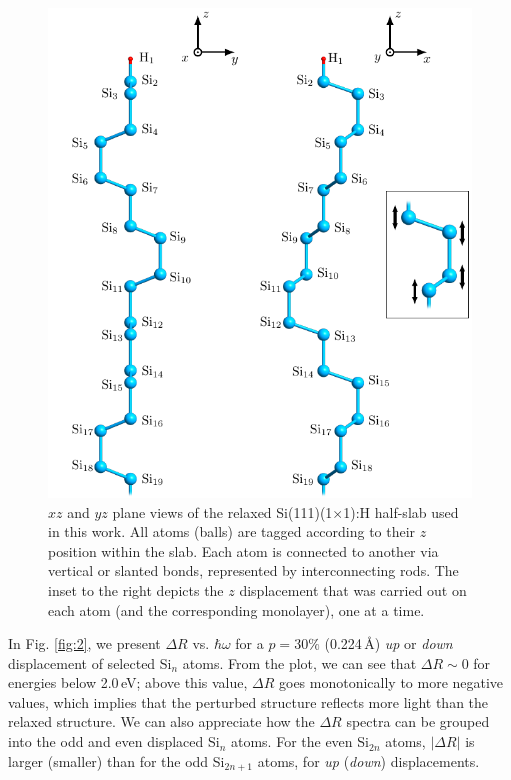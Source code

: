 \documentclass[pss]{wiley2sp} %
\begin{document}
\begin{figure}[t]%
\includegraphics[width=\linewidth]{fig01}
\caption{$xz$ and $yz$ plane views of the relaxed Si(111)(1$\times$1):H
half-slab used in this work. All atoms (balls) are tagged according to their $z$
position within the slab. Each atom is connected to another via vertical or
slanted bonds, represented by interconnecting rods. The inset to the right
depicts the $z$ displacement that was carried out on {\color{red}each atom (and the corresponding monolayer)}, one
at a time.}
\label{fig:3dstruc}
\end{figure}

In Fig. \ref{fig:2}, we present $\Delta R$ vs. $\hbar\omega$ for a $p = 30\%$
(0.224\,\AA) \emph{up} or \emph{down} displacement of selected Si$_{n}$ atoms.
From the plot, we can see that $\Delta R \sim 0$ for energies below 2.0\,eV;
above this value, $\Delta R$ goes monotonically to more negative values, which
implies that the perturbed structure reflects more light than the relaxed
structure. We can also appreciate how the $\Delta R$ spectra can be grouped into
the odd and even displaced Si$_{n}$ atoms. For the even Si$_{2n}$ atoms,
$|\Delta R|$ is larger (smaller) than for the odd Si$_{2n+1}$ atoms, for
\emph{up} (\emph{down}) displacements.
\end{document}
